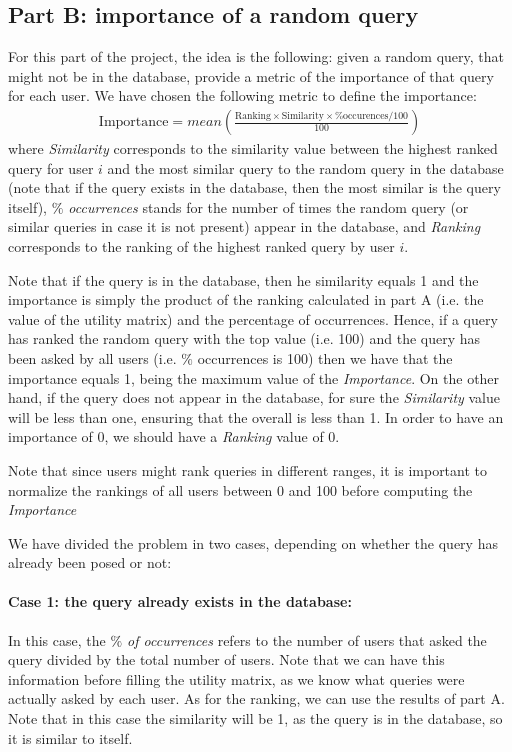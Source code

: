 \documentclass[sigconf]{acmart}
\begin{document}
\subsection{Part B: importance of a random query
}
For this part of the project, the idea is the following: given a random query, that might not be in the database, provide a metric of the importance of that query for each user. We have chosen the following metric to define the importance:
\begin{eqnarray}
    \mbox{Importance} = mean(\frac{\mbox{Ranking} \times \mbox{Similarity} \times \mbox{\% occurences/100}}{100}) \label{eq:imp}
\end{eqnarray}
where \textit{Similarity} corresponds to the similarity value between the highest ranked query for user $i$ and the most similar query to the random query in the database (note that if the query exists in the database, then the most similar is the query itself), \textit{$\%$ occurrences} stands for the number of times the random query (or similar queries in case it is not present) appear in the database, and \textit{Ranking} corresponds to the ranking of the highest ranked query by user $i$. 

Note that if the query is in the database, then he similarity equals 1 and the importance is simply the product of the ranking calculated in part A (i.e. the value of the utility matrix) and the percentage of occurrences. Hence, if a query has ranked the random query with the top value (i.e. 100) and the query has been asked by all users (i.e. $\%$ occurrences is 100) then we have that the importance equals 1, being the maximum value of the \textit{Importance}. On the other hand, if the query does not appear in the database, for sure the \textit{Similarity} value will be less than one, ensuring that the overall  is less than 1. In order to have an importance of 0, we should have a \textit{Ranking} value of 0.

Note that since users might rank queries in different ranges, it is important to normalize the rankings of all users between 0 and 100 before computing the \textit{Importance}

We have divided the problem in two cases, depending on whether the query has already been posed or not: 

\paragraph{Case 1: the query already exists in the database:}
In this case, the \textit{$\%$ of occurrences} refers to the number of users that asked the query divided by the total number of users. Note that we can have this information before filling the utility matrix, as we know what queries were actually asked by each user. As for the ranking, we can use the results of part A. Note that in this case the similarity will be 1, as the query is in the database, so it is similar to itself.
\end{document}
